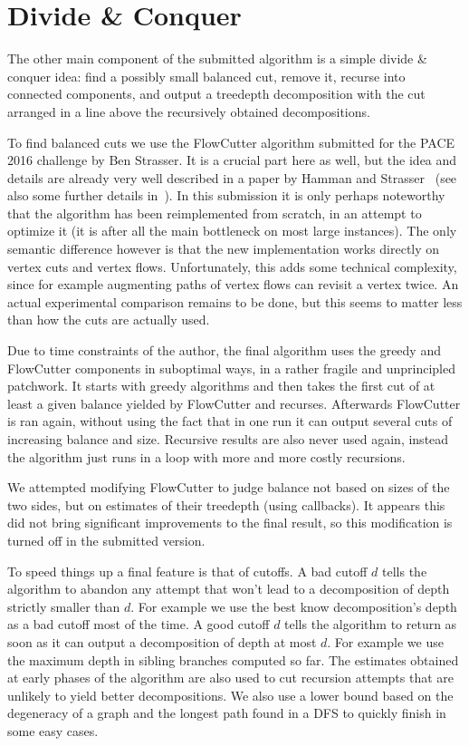 \documentclass{timgad}
\begin{document}
\section{Divide \& Conquer}
The other main component of the submitted algorithm is a simple divide \& conquer idea: find a possibly small balanced cut, remove it, recurse into connected components, and output a treedepth decomposition with the cut arranged in a line above the recursively obtained decompositions.

To find balanced cuts we use the FlowCutter algorithm submitted for the PACE 2016 challenge by Ben Strasser.
It is a crucial part here as well, but the idea and details are already very well described in a paper by Hamman and Strasser~\cite{HamannS18} (see also some further details in~\cite{Strasser17}).
In this submission it is only perhaps noteworthy that the algorithm has been reimplemented from scratch,
in an attempt to optimize it (it is after all the main bottleneck on most large instances).
The only semantic difference however is that the new implementation works directly on vertex cuts and vertex flows.
Unfortunately, this adds some technical complexity, since for example augmenting paths of vertex flows can revisit a vertex twice.
An actual experimental comparison remains to be done, but this seems to matter less than how the cuts are actually used.

Due to time constraints of the author, the final algorithm uses the greedy and FlowCutter components in suboptimal ways, in a rather fragile and unprincipled patchwork.
It starts with greedy algorithms and then takes the first cut of at least a given balance yielded by FlowCutter and recurses.
Afterwards FlowCutter is ran again, without using the fact that in one run it can output several cuts of increasing balance and size.
Recursive results are also never used again, instead the algorithm just runs in a loop with more and more costly recursions.

We attempted modifying FlowCutter to judge balance not based on sizes of the two sides, but on estimates of their treedepth (using callbacks).
It appears this did not bring significant improvements to the final result, so this modification is turned off in the submitted version.

To speed things up a final feature is that of cutoffs.
A bad cutoff $d$ tells the algorithm to abandon any attempt that won't lead to a decomposition of depth strictly smaller than $d$.
For example we use the best know decomposition's depth as a bad cutoff most of the time.
A good cutoff $d$ tells the algorithm to return as soon as it can output a decomposition of depth at most $d$.
For example we use the maximum depth in sibling branches computed so far.
The estimates obtained at early phases of the algorithm are also used to cut recursion attempts that are unlikely to yield better decompositions.
We also use a lower bound based on the degeneracy of a graph and the longest path found in a DFS to quickly finish in some easy cases.
\end{document}
